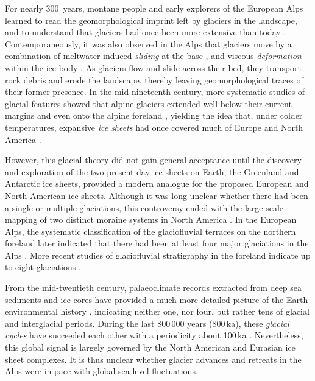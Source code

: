 \documentclass[tc, manuscript]{copernicus}
\begin{document}
    For nearly 300~years, montane people and early explorers of the European
    Alps learned to read the geomorphological imprint left by glaciers in the
    landscape, and to understand that glaciers had once been more extensive
    than today \citep[e.g.,][p.~21]{Windham.Martel.1744}. Contemporaneously,
    it was also observed in the Alps that glaciers move by a combination of
    meltwater-induced \emph{sliding} at the base \citep[\S532]{Saussure.1779},
    and viscous \emph{deformation} within the ice body \citep{Forbes.1846b}. As
    glaciers flow and slide across their bed, they transport rock debris and
    erode the landscape, thereby leaving geomorphological traces of their
    former presence. In the mid-nineteenth
    century, more systematic studies of glacial features showed that alpine
    glaciers extended well below their current margins \citep{Venetz.1821}
    and even onto the alpine foreland \citep{Charpentier.1841}, yielding the
    idea that, under colder temperatures, expansive \emph{ice sheets} had once
    covered much of Europe and North America \citep{Agassiz.1840}.

    However, this glacial theory did not gain general acceptance until the
    discovery and exploration of the two present-day ice sheets on Earth, the
    Greenland and Antarctic ice sheets, provided a modern analogue for the
    proposed European and North American ice sheets. Although it was long
    unclear whether there had been a single or multiple glaciations,
    this controversy ended with the large-scale mapping of two distinct moraine
    systems in North America \citep{Chamberlin.1894}. In the European Alps, the
    systematic classification of the glaciofluvial terraces on the northern
    foreland later indicated that there had been at least four major
    glaciations in the Alps \citep{Penck.Bruckner.1909}. More recent studies
    of glaciofluvial stratigraphy in the foreland indicate up to eight
    glaciations \citep{Ivy-Ochs.etal.2008, Preusser.etal.2011}.

    From the mid-twentieth
    century, palaeoclimate records extracted from deep sea sediments and
    ice cores have provided a much more detailed picture of the Earth
    environmental history \citep[e.g.,][]{Emiliani.1955,
    Shackleton.Opdyke.1973, Dansgaard.etal.1993, Augustin.etal.2004},
    indicating neither one, nor four, but rather tens of glacial and
    interglacial periods. During the last 800\,000 years (800\,ka), these
    \emph{glacial cycles}
    have succeeded each other with a periodicity about 100\,ka \citep{Hays.etal.1976,
    Augustin.etal.2004}. Nevertheless, this global signal is largely governed
    by the North American and Eurasian ice sheet complexes. It is thus unclear
    whether glacier advances and retreats in the Alps were in pace with global
    sea-level fluctuations.
\end{document}
